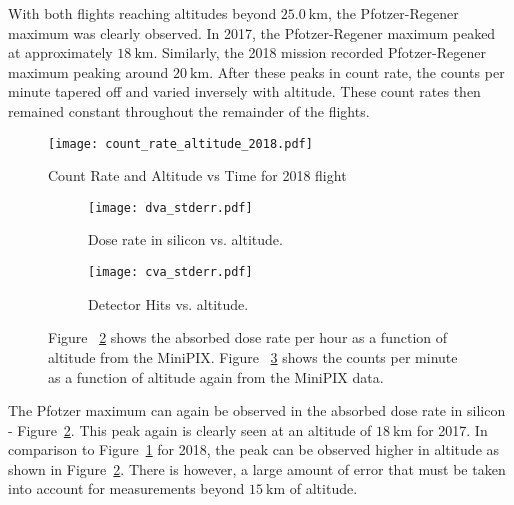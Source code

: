 With both flights reaching altitudes beyond $\SI{25.0}{\kilo\meter}$, the Pfotzer-Regener maximum was clearly observed.  In 2017, the Pfotzer-Regener maximum peaked at approximately  $\SI{18}{\kilo\meter}$.  Similarly, the 2018 mission recorded Pfotzer-Regener maximum peaking around $\SI{20}{\kilo\meter}$. After these peaks in count rate, the counts per minute tapered off and varied inversely with altitude.  These count rates then remained constant throughout the remainder of the flights.
\begin{figure}[H]
\centering
\texttt{[image: count\_rate\_altitude\_2018.pdf]}
\caption{Count Rate and Altitude vs Time for 2018 flight}
\label{fig:ratealttime_2018}
\end{figure}
%
%
%
\begin{figure}[H]
\centering
\begin{subfigure}{.5\textwidth}
  \centering
  \texttt{[image: dva\_stderr.pdf]}
  \caption{Dose rate in silicon vs. altitude.}
  \label{fig:sub1}
\end{subfigure}%
\begin{subfigure}{.5\textwidth}
  \centering
  \texttt{[image: cva\_stderr.pdf]}
  \caption{Detector Hits vs. altitude.}
  \label{fig:sub2}
\end{subfigure}
\caption{Figure ~\ref{fig:sub1} shows the absorbed dose rate per hour as a function of altitude from the MiniPIX.  Figure ~\ref{fig:sub2} shows the counts per minute as a function of altitude again from the MiniPIX data.}
\label{fig:test}
\end{figure}
The Pfotzer maximum can again be observed in the absorbed dose rate in silicon - Figure~\ref{fig:sub1}.  This peak again is clearly seen at an altitude of $\SI{18}{\kilo\meter}$ for 2017.  In comparison to Figure~\ref{fig:ratealttime_2018} for 2018, the peak can be observed higher in altitude as shown in Figure~\ref{fig:sub1}.  There is however, a large amount of error that must be taken into account for measurements beyond $\SI{15}{\kilo\meter}$ of altitude. 

